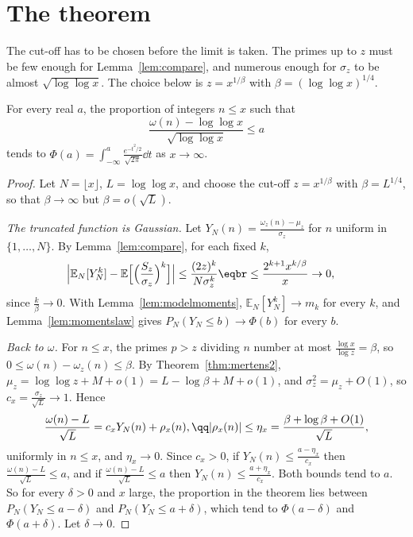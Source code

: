 \section{The theorem}

The cut-off has to be chosen before the limit is taken. The primes up to $z$ must be few enough for Lemma~\ref{lem:compare}, and numerous enough for $\sigma_z$ to be almost $\sqrt{\log\log x}$. The choice below is $z=x^{1/\beta}$ with $\beta=(\log\log x)^{1/4}$.

\begin{theorem}\label{thm:erdoskac}
For every real $a$, the proportion of integers $n\le x$ such that
\[
\frac{\omega(n)-\log\log x}{\sqrt{\log\log x}}\le a
\]
tends to $\Phi(a)=\int_{-\infty}^a\frac{e^{-t^2/2}}{\sqrt{2\pi}}\dd t$ as $x\to\infty$.
\end{theorem}
\begin{proof}
Let $N=\lfloor x\rfloor$, $L=\log\log x$, and choose the cut-off $z=x^{1/\beta}$ with $\beta=L^{1/4}$, so that $\beta\to\infty$ but $\beta=o(\sqrt L)$.

\emph{The truncated function is Gaussian.} Let $Y_N(n)=\frac{\omega_z(n)-\mu_z}{\sigma_z}$ for $n$ uniform in $\{1,\dots,N\}$. By Lemma~\ref{lem:compare}, for each fixed $k$,
\[
\begin{aligned}\Bigl|\mathbb E_N[Y_N^k]-\mathbb E\Bigl[\Bigl(\frac{S_z}{\sigma_z}\Bigr)^k\Bigr]\Bigr|&\le\frac{(2z)^k}{N\sigma_z^k}\eqbr\le\frac{2^{k+1}x^{k/\beta}}x\to0,\end{aligned}
\]
since $\frac k\beta\to0$. With Lemma~\ref{lem:modelmoments}, $\mathbb E_N[Y_N^k]\to m_k$ for every $k$, and Lemma~\ref{lem:momentslaw} gives $P_N(Y_N\le b)\to\Phi(b)$ for every $b$.

\emph{Back to $\omega$.} For $n\le x$, the primes $p>z$ dividing $n$ number at most $\frac{\log x}{\log z}=\beta$, so $0\le\omega(n)-\omega_z(n)\le\beta$. By Theorem~\ref{thm:mertens2}, $\mu_z=\log\log z+M+o(1)=L-\log\beta+M+o(1)$, and
$\sigma_z^2=\mu_z+O(1)$, so $c_x=\frac{\sigma_z}{\sqrt L}\to1$. Hence
\[
\begin{gathered}\frac{\omega(n)-L}{\sqrt L}=c_xY_N(n)+\rho_x(n),\qq|\rho_x(n)|\le\eta_x=\frac{\beta+\log\beta+O(1)}{\sqrt L},\end{gathered}
\]
uniformly in $n\le x$, and $\eta_x\to0$. Since $c_x>0$, if $Y_N(n)\le\frac{a-\eta_x}{c_x}$ then $\frac{\omega(n)-L}{\sqrt L}\le a$, and if $\frac{\omega(n)-L}{\sqrt L}\le a$ then $Y_N(n)\le\frac{a+\eta_x}{c_x}$. Both bounds tend to $a$. So for every $\delta>0$
and $x$ large, the proportion in the theorem lies between $P_N(Y_N\le a-\delta)$ and $P_N(Y_N\le a+\delta)$, which tend to $\Phi(a-\delta)$ and $\Phi(a+\delta)$. Let $\delta\to0$.
\end{proof}


